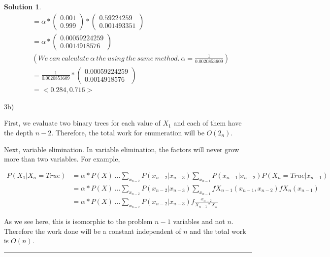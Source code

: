 \documentclass{article}
\theoremstyle{definition}
\def\fline{\rule{0.75\linewidth}{0.5pt}}
\newcommand{\finishline}{\begin{center}\fline\end{center}}
\newtheorem*{solution*}{Solution}
\newenvironment{solution}{\begin{solution*}}{{\finishline} \end{solution*}}
\begin{document}
\begin{solution}
\begin{align*}
        & = \alpha * \left( \begin{array}{c} 0.001 \\ 0.999 \end{array} \right) * \left( \begin{array}{c} 0.59224259 \\ 0.001493351 \end{array} \right)\\
        & = \alpha * \left( \begin{array}{c} 0.00059224259 \\ 0.0014918576 \end{array} \right)\\
        & ( We \ can \ calculate \ \alpha  \ the \ using \ the \ same \ method. \ \alpha = \frac{1}{0.0020853609})\\ 
        & = \frac{1}{0.0020853609} * \left( \begin{array}{c} 0.00059224259 \\ 0.0014918576 \end{array} \right) \\
        & = <0.284, 0.716>
    \end{align*}  

	\item 3b) 
	\item First, we evaluate two binary trees for each value of $X_{1}$ and each of them have the depth $n - 2$. Therefore, the total work for enumeration will be $O(2_{n})$.
	\item Next, variable elimination. In variable elimination, the factors will never grow more than two variables. For example,
    	\item \begin{align*}
    	P(X_{1} | X_{n} = True) 
    	& = \alpha * P(X)  \ ...\sum_{x_{n-2}} P(x_{n-2} | x_{n-3}) \sum_{x_{n-1}} P(x_{n-1} | x_{n-2}) P(X_{n} = True | x_{n-1})\\
    	& = \alpha * P(X) \ ... \sum_{x_{n-2}} P(x_{n-2} | x_{n-3}) \sum_{x_{n-1}} f X_{n-1}(x_{n-1}, x_{n-2}) f X_{n}(x_{n-1})\\
	& = \alpha * P(X) \ ... \sum_{x_{n-2}}P(x_{n-2} | x_{n-3}) f \frac{x_{n-2}}{X_{n-1}* X_{n}}
    \end{align*}
	\item  As we see here, this is isomorphic to the problem $n-1$ variables and not $n$. Therefore the work done will be a constant independent of $n$ and the total work is $O(n)$.

\end{solution}
\end{document}

